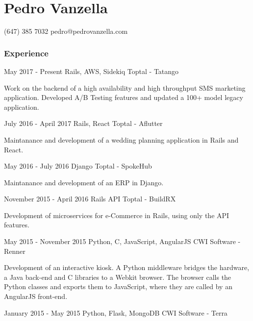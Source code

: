 \documentclass{tccv}
\begin{document}
\part{Pedro Vanzella}

    {(647) 385 7032}
    {pedro@pedrovanzella.com}

    \section{Experience}

    \begin{eventlist}

    \item{May 2017 - Present}
      {Rails, AWS, Sidekiq}
      {Toptal - Tatango}

      Work on the backend of a high availability and high throughput SMS
      marketing application. Developed A/B Testing features and updated a
      100+ model legacy application.

    \item{July 2016 - April 2017}
      {Rails, React}
      {Toptal - Aflutter}

      Maintanance and development of a wedding planning application in Rails and
      React.

    \item{May 2016 - July 2016}
      {Django}
      {Toptal - SpokeHub}

      Maintanance and development of an ERP in Django.

    \item{November 2015 - April 2016}
      {Rails API}
      {Toptal - BuildRX}

      Development of microservices for e-Commerce in Rails, using only the API features.

    \item{May 2015 - November 2015}
      {Python, C, JavaScript, AngularJS}
      {CWI Software - Renner}
      
      Development of an interactive kiosk. A Python middleware bridges the hardware, a
      Java back-end and C libraries to a Webkit browser. The browser calls the Python
      classes and exports them to JavaScript, where they are called by an AngularJS front-end.

    \item{January 2015 - May 2015}
      {Python, Flask, MongoDB}
      {CWI Software - Terra}


\end{eventlist}
\end{document}
